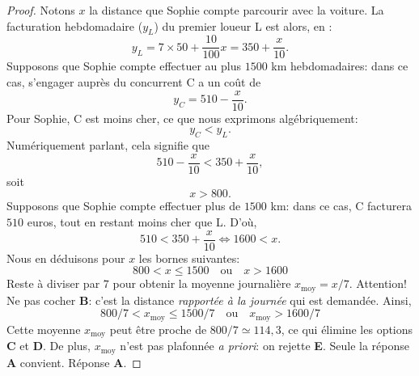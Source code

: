 \begin{proof}
Notons $x$ la distance que Sophie compte parcourir avec la voiture. La facturation hebdomadaire ($y_L$) du premier loueur L %
est alors, en \currency:  
%
\begin{equation}
 y_L = 7 \times 50 + \frac{10}{100}x  = 350 + \frac{x}{10}. 
\end{equation}
%
Supposons que Sophie compte effectuer au plus $1500$ km hebdomadaires: dans ce cas, s'engager auprès du concurrent C a un %
coût de 
%
\begin{equation}
  y_C = 510 - \frac{x}{10}. 
\end{equation}
%
Pour Sophie, C est moins cher, ce que nous exprimons algébriquement: 
%
\begin{equation}
  y_C < y_L.
\end{equation}
%
Numériquement parlant, cela signifie que
%
\begin{equation}
  510 - \frac{x}{10} < 350 + \frac{x}{10}, 
\end{equation}
%
soit 
%
\begin{equation}
  x > 800.
\end{equation}
%
Supposons que Sophie compte effectuer plus de $1500$ km: dans ce cas, C facturera $510$ euros, tout en restant moins cher que %
L. D'où,
%
\begin{equation}
  510 < 350 + \frac{x}{10} \iff 1600 < x.
\end{equation}
%
Nous en déduisons pour $x$ les bornes suivantes:
%
\begin{equation}
  800 < x \leq 1500 \quad\text{ou}\quad x > 1600
\end{equation}
%
Reste à diviser par $7$ pour obtenir la moyenne journalière $x_{\text{moy}} = x/7$. Attention! Ne pas cocher \textbf{B}: %
c'est la distance \emph{rapportée à la journée} qui est demandée. Ainsi, 
%
\begin{equation}
  800/7 < x_{\text{moy}} \leq 1500/7 \quad\text{ou}\quad  x_{\text{moy}} > 1600/7
\end{equation}
%
Cette moyenne $x_{\text{moy}}$ peut être proche de $800/7 \simeq 114{,}3$, ce qui élimine les options \textbf{C} et \textbf{D}. 
De plus, $x_{\text{moy}}$ n'est pas plafonnée \emph{a priori}: on rejette \textbf{E}. Seule la réponse \textbf{A} convient. %
Réponse \textbf{A}.
\end{proof}